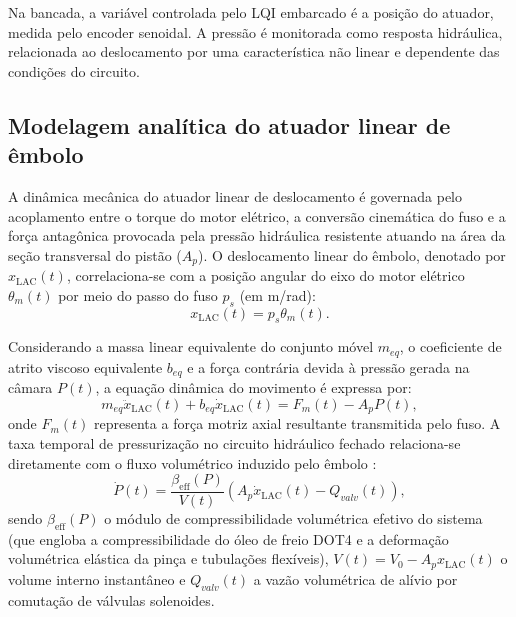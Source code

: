 Na bancada, a variável controlada pelo LQI embarcado é a posição do atuador, medida pelo encoder senoidal. A pressão é monitorada como resposta hidráulica, relacionada ao deslocamento por uma característica não linear e dependente das condições do circuito.

\subsection{Modelagem analítica do atuador linear de êmbolo}
\label{sec:modelagem-deslocamento-linear}

A dinâmica mecânica do atuador linear de deslocamento é governada pelo acoplamento entre o torque do motor elétrico, a conversão cinemática do fuso e a força antagônica provocada pela pressão hidráulica resistente atuando na área da seção transversal do pistão ($A_p$). O deslocamento linear do êmbolo, denotado por $x_{\mathrm{LAC}}(t)$, correlaciona-se com a posição angular do eixo do motor elétrico $\theta_m(t)$ por meio do passo do fuso $p_s$ (em m/rad):
\begin{equation}
    x_{\mathrm{LAC}}(t) = p_s \theta_m(t).
    \label{eq:fuso_relacao}
\end{equation}

Considerando a massa linear equivalente do conjunto móvel $m_{eq}$, o coeficiente de atrito viscoso equivalente $b_{eq}$ e a força contrária devida à pressão gerada na câmara $P(t)$, a equação dinâmica do movimento é expressa por:
\begin{equation}
    m_{eq} \ddot{x}_{\mathrm{LAC}}(t) + b_{eq} \dot{x}_{\mathrm{LAC}}(t) = F_m(t) - A_p P(t),
    \label{eq:dinamica_newton_lac}
\end{equation}
onde $F_m(t)$ representa a força motriz axial resultante transmitida pelo fuso. A taxa temporal de pressurização no circuito hidráulico fechado relaciona-se diretamente com o fluxo volumétrico induzido pelo êmbolo \cite{xiong2021piston}:
\begin{equation}
    \dot{P}(t) = \frac{\beta_{\mathrm{eff}}(P)}{V(t)} \left( A_p \dot{x}_{\mathrm{LAC}}(t) - Q_{valv}(t) \right),
    \label{eq:derivada_pressao_lac}
\end{equation}
sendo $\beta_{\mathrm{eff}}(P)$ o módulo de compressibilidade volumétrica efetivo do sistema (que engloba a compressibilidade do óleo de freio DOT4 e a deformação volumétrica elástica da pinça e tubulações flexíveis), $V(t) = V_0 - A_p x_{\mathrm{LAC}}(t)$ o volume interno instantâneo e $Q_{valv}(t)$ a vazão volumétrica de alívio por comutação de válvulas solenoides.

